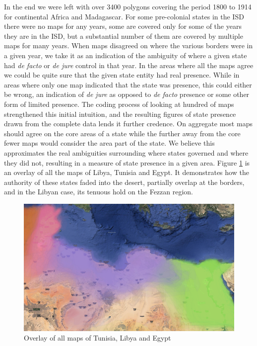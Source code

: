 \documentclass[12pt]{article}
\begin{document}
In the end we were left with over 3400 polygons covering the period 1800 to 1914
for continental Africa and Madagascar. For some pre-colonial states in the ISD
there were no maps for any years, some are covered only for some of the years
they are in the ISD, but a substantial number of them are covered by multiple
maps for many years. When maps disagreed on where the various borders were in a
given year, we take it as an indication of the ambiguity of where a given state
had \emph{de facto} or \emph{de jure} control in that year. In the areas where
all the maps agree we could be quite sure that the given state entity had real
presence.  While in areas where only one map indicated that the state was
presence, this could either be wrong, an indication of \emph{de jure} as opposed
to \emph{de facto} presence or some other form of limited presence. The coding
process of looking at hundred of maps strengthened this initial intuition, and
the resulting figures of state presence drawn from the complete data lends it
further credence. On aggregate most maps should agree on the core areas of a
state while the further away from the core fewer maps would consider the area
part of the state. We believe this approximates the real ambiguities surrounding
where states governed and where they did not, resulting in a measure of state
presence in a given area. Figure \ref{overlay} is an overlay of all the maps of
Libya, Tunisia and Egypt. It demonstrates how the authority of these states
faded into the desert, partially overlap at the borders, and in the Libyan case,
its tenuous hold on the Fezzan region. 

\begin{figure}[!htb]
	\includegraphics[width=\textwidth,keepaspectratio]{../TUNLIBEGY.pdf}
	\caption{Overlay of all maps of Tunisia, Libya and Egypt}
	\label{overlay}
\end{figure}
\end{document}
